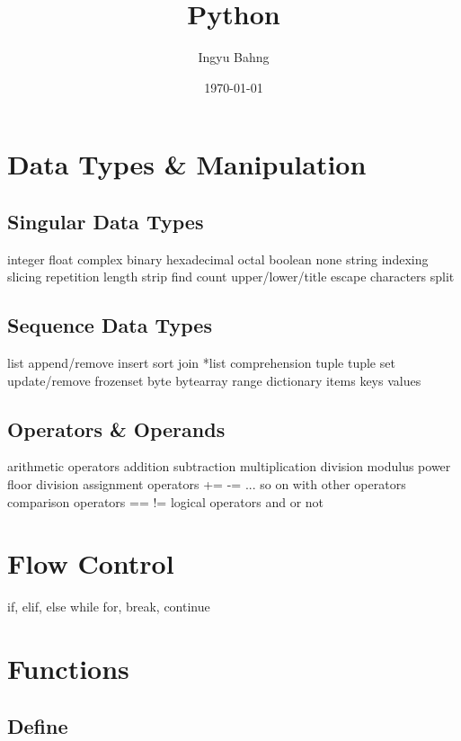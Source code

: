 \documentclass[10pt]{article}
\title{Python}
\date{\today}
\author{Ingyu Bahng}
\begin{document}


\section{Data Types \& Manipulation}

  \subsection{Singular Data Types}

    integer
    float
    complex
    binary
    hexadecimal
    octal
    boolean
    none
    string
      indexing
      slicing
      repetition
      length
      strip
      find
      count
      upper/lower/title
      escape characters
      split

  \subsection{Sequence Data Types}

    list
      append/remove
      insert
      sort
      join
      *list comprehension
    tuple
      tuple
    set
      update/remove
      frozenset
    byte
    bytearray
    range
    dictionary
      items
      keys
      values

  \subsection{Operators \& Operands}

    arithmetic operators
      addition
      subtraction
      multiplication
      division
      modulus
      power
      floor division
    assignment operators
      +=
      -=
      ... so on with other operators
    comparison operators
      ==
      !=
    logical operators
      and
      or
      not

\section{Flow Control}
  
  if, elif, else
  while
  for, break, continue

\section{Functions}

  \subsection{Define}
\end{document}

